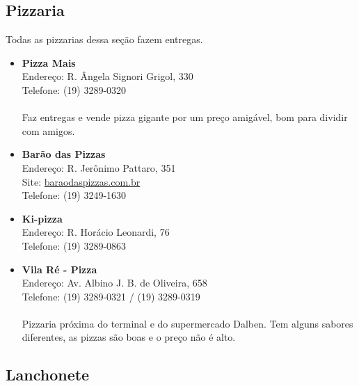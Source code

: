 \subsection{Pizzaria}

Todas as pizzarias dessa seção fazem entregas.

\begin{itemize}
\item \textbf{Pizza Mais}
  \\Endereço: R. Ângela Signori Grigol, 330
  \\Telefone: (19) 3289-0320
  \\
  \\Faz entregas e vende pizza gigante por um preço amigável, bom para dividir
  com amigos.
\item \textbf{Barão das Pizzas}
  \\Endereço: R. Jerônimo Pattaro, 351
  \\Site: \url{baraodaspizzas.com.br}
  \\Telefone: (19) 3249-1630
\item \textbf{Ki-pizza}
  \\Endereço: R. Horácio Leonardi, 76
  \\Telefone: (19) 3289-0863
\item \textbf{Vila Ré - Pizza}
  \\Endereço: Av. Albino J. B. de Oliveira, 658
  \\Telefone: (19) 3289-0321 / (19) 3289-0319
  \\
  \\Pizzaria próxima do terminal e do supermercado Dalben. Tem alguns sabores
  diferentes, as pizzas são boas e o preço não é alto.
\end{itemize}

\subsection{Lanchonete}

